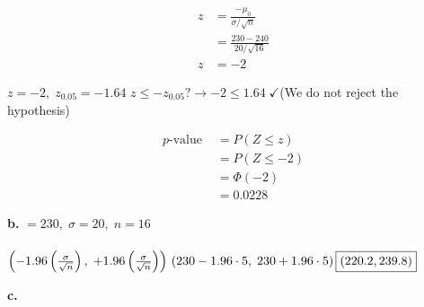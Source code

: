 \documentclass[12pt]{report}
\makeatletter
\newcommand*{\xbar}{}%
\DeclareRobustCommand*{\xbar}{%
	\mathpalette\@xbar{}%
}
\newcommand*{\@xbar}[2]{%
	\sbox0{$#1\mathrm{x}\m@th$}%
	\sbox2{$#1x\m@th$}%
	\rlap{%
		\hbox to\wd2{%
			\hfill
			$\overline{%
				\vrule width 0pt height\ht0 %
				\kern\wd0 %
			}$%
		}%
	}%
	\copy2 %
}
\makeatother
\begin{document}
\begin{align*}
	z &= \frac{\xbar - \mu_0}{\sigma / \sqrt{n}}\\
	&= \frac{230-240}{20/\sqrt{16}}\\
	z &= -2
\end{align*}

$z = -2, \; z_{0.05} = -1.64$
$z \leq -z_{0.05}? \rightarrow \boxed{-2 \leq 1.64 \;\checkmark}$(We do not reject the hypothesis)

\begin{align*}
	p\text{-value } &= P(Z \leq z)\\
	&= P(Z \leq -2)\\
	&= \Phi(-2)\\
	&= \boxed{0.0228}
\end{align*}

\pagebreak
\noindent \textbf{b.} $\xbar = 230, \; \sigma = 20, \; n = 16$\\\\
\begin{math}
\left(\xbar - 1.96\left(\frac{\sigma}{\sqrt{n}}\right), \;\xbar + 1.96\left(\frac{\sigma}{\sqrt{n}}\right)\right)\\
\left(230 - 1.96 \cdot 5, \; 230 + 1.96 \cdot 5\right)\\
\boxed{(220.2, 239.8)}
\end{math}

\noindent \textbf{c.}
\end{document}
